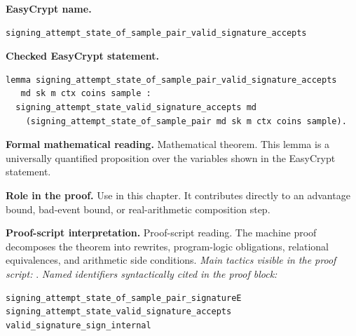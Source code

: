 \begin{formaltheorem}
\noindent\textbf{EasyCrypt name.}
\begin{lstlisting}[language=EasyCrypt,basicstyle=\ttfamily\scriptsize]
signing_attempt_state_of_sample_pair_valid_signature_accepts
\end{lstlisting}
\noindent\textbf{Checked EasyCrypt statement.}
\begin{lstlisting}[language=EasyCrypt,basicstyle=\ttfamily\scriptsize]
lemma signing_attempt_state_of_sample_pair_valid_signature_accepts
   md sk m ctx coins sample :
  signing_attempt_state_valid_signature_accepts md
    (signing_attempt_state_of_sample_pair md sk m ctx coins sample).
\end{lstlisting}
\noindent\textbf{Formal mathematical reading.}
Mathematical theorem. This lemma is a universally quantified proposition over the variables shown in the EasyCrypt statement.

\noindent\textbf{Role in the proof.}
Use in this chapter. It contributes directly to an advantage bound, bad-event bound, or real-arithmetic composition step.

\noindent\textbf{Proof-script interpretation.}
Proof-script reading. The machine proof decomposes the theorem into rewrites, program-logic obligations, relational equivalences, and arithmetic side conditions.
\emph{Main tactics visible in the proof script:} .
\emph{Named identifiers syntactically cited in the proof block:}
\begin{lstlisting}[language=EasyCrypt,basicstyle=\ttfamily\scriptsize]
signing_attempt_state_of_sample_pair_signatureE
signing_attempt_state_valid_signature_accepts
valid_signature_sign_internal
\end{lstlisting}

\end{formaltheorem}

